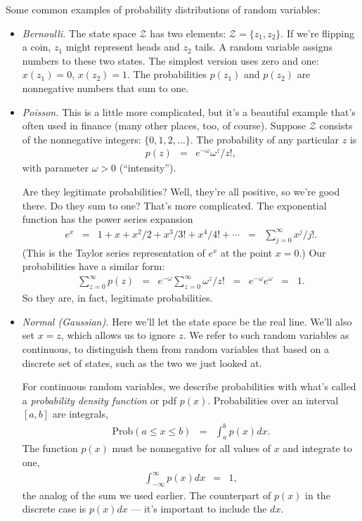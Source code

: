 \documentclass[11pt]{article}
\begin{document}
Some common examples of probability distributions of random variables:
%
\begin{itemize}
\item {\it Bernoulli.\/}
The state space $\mathcal{Z}$ has two elements:  $\mathcal{Z} = \{z_1, z_2\}$.
If we're flipping a coin, $z_1$ might represent heads and $z_2$ tails.
A random variable assigns numbers to these two states.
The simplest version uses zero and one:
$x(z_1) = 0$, $x(z_2) = 1$.
The probabilities $p(z_1)$ and $p(z_2)$ are nonnegative numbers that sum to one.


\item {\it Poisson.\/}
This is a little more complicated, but it's a beautiful example
that's often used in finance (many other places, too, of course).
Suppose $\mathcal{Z}$ consists of the nonnegative integers:  $\{ 0, 1, 2, \ldots \}$.
The probability of any particular $z$ is
\begin{eqnarray*}
    p(z) &=& e^{-\omega} \omega^z/z! ,
\end{eqnarray*}
with parameter $\omega > 0$ (``intensity'').


Are they legitimate probabilities?
Well, they're all positive, so we're good there.
Do they sum to one?
That's more complicated.
The exponential function has the power series expansion
\begin{eqnarray}
    e^x &=& 1 + x + x^2/2 + x^3/3! + x^4/4! + \cdots
            \;\;=\;\; \sum_{j=0}^\infty x^j/j!.
    \label{eq:eofx-powerseries}
\end{eqnarray}
(This is the Taylor series representation of $e^x$ at the point $x=0$.)
Our probabilities have  a similar form:
\begin{eqnarray*}
    \sum_{z=0}^\infty p(z) &=& e^{-\omega} \sum_{z=0}^\infty \omega^z/z!
                \;\;=\;\; e^{-\omega} e^{\omega}
                \;\;=\;\; 1.
\end{eqnarray*}
So they are, in fact, legitimate probabilities. %

\item {\it Normal (Gaussian).\/}
Here we'll let the state space be the real line.
We'll also set $x=z$, which allows us to ignore $z$.
We refer to such random variables as continuous,
to distinguish them from random variables that
based on a discrete set of states, such as the two we just looked at.

For continuous random variables,
we describe probabilities
with what's called a {\it probability density function\/} or pdf $p(x)$.
Probabilities over an interval $[a,b]$ are integrals,
\begin{eqnarray*}
    \mbox{Prob} ( a\leq x \leq b ) &=& \int_{a}^b p(x) dx .
\end{eqnarray*}
The function $p(x)$ must be nonnegative for all values of $x$
and integrate to one,
\begin{eqnarray*}
    \int_{-\infty}^\infty p(x) dx &=& 1 ,
\end{eqnarray*}
the analog of the sum we used earlier.
The counterpart of $p(x)$ in the discrete case is $p(x) dx$
--- it's important to include the $dx$.


\end{itemize}
\end{document}
